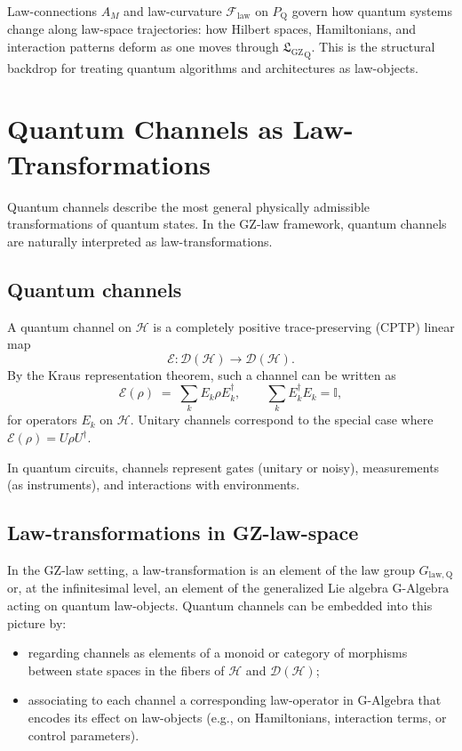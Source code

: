 \documentclass[11pt]{book}
\newcommand{\GAlgebra}{\text{G-Algebra}}
\newcommand{\GZLS}{\ensuremath{\mathfrak{L}_{\mathrm{GZ}}}}
\newcommand{\GZLOC}{\ensuremath{A_M}}
\newcommand{\GZLCurv}{\ensuremath{\mathcal{F}_{\mathrm{law}}}}
\newcommand{\Bundle}{\ensuremath{P}}
\theoremstyle{plain}
\theoremstyle{definition}
\theoremstyle{remark}
\begin{document}
Law-connections $\GZLOC$ and law-curvature $\GZLCurv$ on
$\Bundle_{\mathrm{Q}}$ govern how quantum systems change along
law-space trajectories: how Hilbert spaces, Hamiltonians, and
interaction patterns deform as one moves through
${\GZLS}_{\mathrm{Q}}$. This is the structural backdrop for treating
quantum algorithms and architectures as law-objects.

\section{Quantum Channels as Law-Transformations}
\label{sec:q-channels-law-transformations}


Quantum channels describe the most general physically admissible
transformations of quantum states. In the GZ-law framework, quantum
channels are naturally interpreted as law-transformations.

\subsection*{Quantum channels}

A quantum channel on $\mathcal{H}$ is a completely positive
trace-preserving (CPTP) linear map
\[
   \mathcal{E} \colon \mathcal{D}(\mathcal{H}) \longrightarrow
   \mathcal{D}(\mathcal{H}).
\]
By the Kraus representation theorem, such a channel can be written
as
\[
   \mathcal{E}(\rho)
   \;=\;
   \sum_{k} E_k \rho E_k^\dagger,
   \qquad
   \sum_k E_k^\dagger E_k = \mathbb{I},
\]
for operators $E_k$ on $\mathcal{H}$. Unitary channels correspond to
the special case where $\mathcal{E}(\rho) = U\rho U^\dagger$.

In quantum circuits, channels represent gates (unitary or noisy),
measurements (as instruments), and interactions with environments.

\subsection*{Law-transformations in GZ-law-space}

In the GZ-law setting, a law-transformation is an element of the
law group $G_{\mathrm{law,Q}}$ or, at the infinitesimal level, an
element of the generalized Lie algebra $\GAlgebra$ acting on
quantum law-objects. Quantum channels can be embedded into this
picture by:
\begin{itemize}
  \item regarding channels as elements of a monoid or category
        of morphisms between state spaces in the fibers of
        $\mathcal{H}$ and $\mathcal{D}(\mathcal{H})$;
  \item associating to each channel a corresponding law-operator in
        $\GAlgebra$ that encodes its effect on law-objects (e.g.,
        on Hamiltonians, interaction terms, or control parameters).
\end{itemize}
\end{document}
